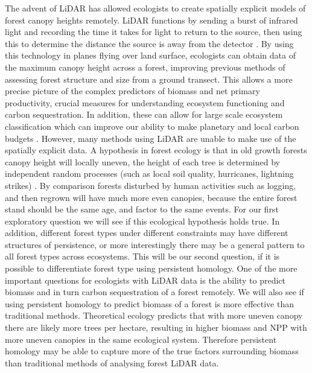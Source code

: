 \documentclass[11pt]{article}
\begin{document}
The advent of LiDAR has allowed ecologists to create spatially explicit models of forest canopy heights remotely. LiDAR functions by sending a burst of infrared light and recording the time it takes for light to return to the source, then using this to determine the distance the source is away from the detector \autocite{baltsavias1999}. By using this technology in planes flying over land surface, ecologists can obtain data  of the maximum canopy height across a forest, improving previous methods of assessing forest structure and size from a ground transect. This allows a more precise picture of the complex predictors of biomass and net primary productivity, crucial measures for understanding ecosystem functioning and carbon sequestration. In addition, these can allow for large scale ecosystem classification which can improve our ability to make planetary and local carbon budgets \autocite{gibbs2007}. However, many methods using LiDAR are unable to make use of the spatially explicit data. A hypothesis in forest ecology is that in old growth forests canopy height will locally uneven, the height of each tree is determined by independent random processes (such as local soil quality, hurricanes, lightning strikes) \autocite{mosseler2003} . By comparison forests disturbed by human activities such as logging, and then regrown will have much more even canopies, because the entire forest stand should be the same age, and factor to the same events. For our first exploratory question we will see if this ecological  hypothesis holds true. In addition, different forest types under different constraints may have different structures of persistence, or more interestingly there may be a general pattern to all forest types across ecosystems. This will be our second question, if it is possible to differentiate forest type using persistent homology. One of the more important questions for ecologists with LiDAR data is the ability to predict biomass and in turn carbon sequestration of a forest remotely. We will also see if using persistent homology to predict biomass of a forest is more effective than traditional methods. Theoretical ecology predicts that with more uneven canopy there are likely more trees per hectare, resulting in higher biomass and NPP with more uneven canopies in the same ecological system. Therefore persistent homology may be able to capture more of the true factors surrounding biomass than traditional methods of analysing forest LiDAR data.
\end{document}
